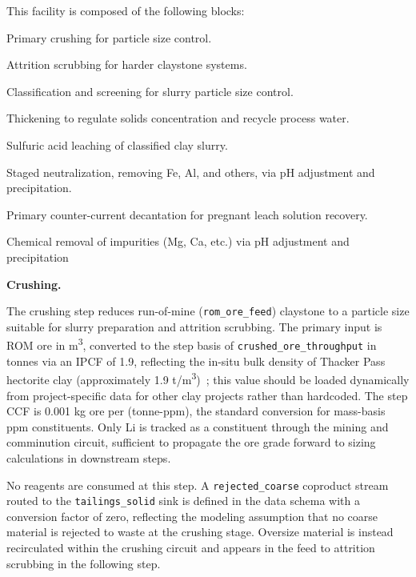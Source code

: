 This facility is composed of the following blocks:

\begin{description}[noitemsep, topsep=0pt]
    \item[\textbullet\enskip\texttt{Crushing:}] Primary crushing for particle size control.
    \item[\textbullet\enskip\texttt{Attrition Scrubbing:}] Attrition scrubbing for harder claystone systems.
    \item[\textbullet\enskip\texttt{Classification:}] Classification and screening for slurry particle size control.
    \item[\textbullet\enskip\texttt{Thickening:}] Thickening to regulate solids concentration and recycle process water.
    \item[\textbullet\enskip\texttt{Acid Leaching:}] Sulfuric acid leaching of classified clay slurry.
    \item[\textbullet\enskip\texttt{Neutralization:}] Staged neutralization, removing Fe, Al, and others, via pH adjustment and precipitation. 
    \item[\textbullet\enskip\texttt{Multistage Primary Counter-Current Decantation:}] Primary counter-current decantation for pregnant leach solution recovery.
    \item[\textbullet\enskip\texttt{Impurity Removal:}] 
    Chemical removal of impurities (Mg, Ca, etc.) via pH adjustment and precipitation
\end{description}

\medskip
\noindent\textbf{Crushing.}\quad

The crushing step reduces run-of-mine (\texttt{rom\_ore\_feed}) claystone to a particle size suitable for slurry preparation and attrition scrubbing. The primary input is ROM ore in m\textsuperscript{3}, converted to the step basis of \texttt{crushed\_ore\_throughput} in tonnes via an IPCF of 1.9, reflecting the in-situ bulk density of Thacker Pass hectorite clay (approximately 1.9 t/m\textsuperscript{3})~\cite{sgscanadaincSK1300Technical2024}; this value should be loaded dynamically from project-specific data for other clay projects rather than hardcoded. The step CCF is 0.001 kg ore per (tonne-ppm), the standard conversion for mass-basis ppm constituents. Only Li is tracked as a constituent through the mining and comminution circuit, sufficient to propagate the ore grade forward to sizing calculations in downstream steps.

No reagents are consumed at this step. A \texttt{rejected\_coarse} coproduct stream routed to the \texttt{tailings\_solid} sink is defined in the data schema with a conversion factor of zero, reflecting the modeling assumption that no coarse material is rejected to waste at the crushing stage. Oversize material is instead recirculated within the crushing circuit and appears in the feed to attrition scrubbing in the following step.

